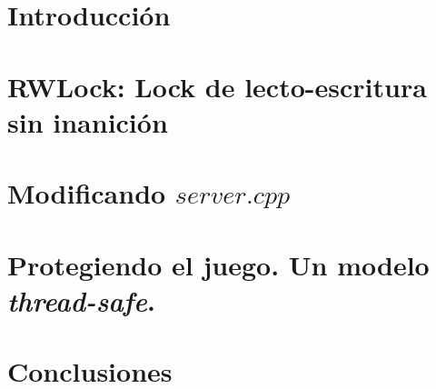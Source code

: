 \documentclass[11pt, a4paper]{article}
\begin{document}

\maketitle
\newpage
\tableofcontents
\newpage


\section{Introducción}

\section{RWLock: Lock de lecto-escritura sin inanición}

\section{Modificando $server.cpp$}

\section{Protegiendo el juego. Un modelo \emph{thread-safe}.}

\section{Conclusiones}

\end{document}
